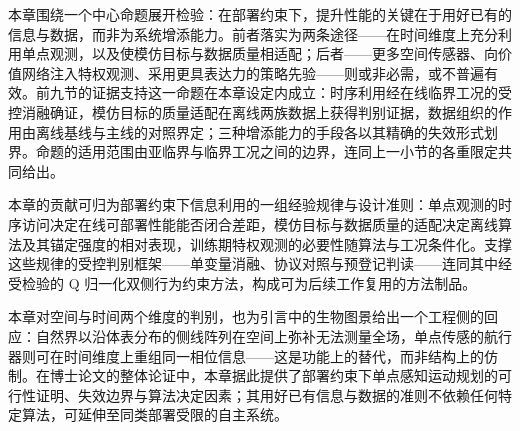 本章围绕一个中心命题展开检验：在部署约束下，提升性能的关键在于用好已有的信息与数据，而非为系统增添能力。前者落实为两条途径——在时间维度上充分利用单点观测，以及使模仿目标与数据质量相适配；后者——更多空间传感器、向价值网络注入特权观测、采用更具表达力的策略先验——则或非必需，或不普遍有效。前九节的证据支持这一命题在本章设定内成立：时序利用经在线临界工况的受控消融确证，模仿目标的质量适配在离线两族数据上获得判别证据，数据组织的作用由离线基线与主线的对照界定；三种增添能力的手段各以其精确的失效形式划界。命题的适用范围由亚临界与临界工况之间的边界，连同上一小节的各重限定共同给出。

本章的贡献可归为部署约束下信息利用的一组经验规律与设计准则：单点观测的时序访问决定在线可部署性能能否闭合差距，模仿目标与数据质量的适配决定离线算法及其锚定强度的相对表现，训练期特权观测的必要性随算法与工况条件化。支撑这些规律的受控判别框架——单变量消融、协议对照与预登记判读——连同其中经受检验的 Q 归一化双侧行为约束方法，构成可为后续工作复用的方法制品。

本章对空间与时间两个维度的判别，也为引言中的生物图景给出一个工程侧的回应：自然界以沿体表分布的侧线阵列在空间上弥补无法测量全场，单点传感的航行器则可在时间维度上重组同一相位信息——这是功能上的替代，而非结构上的仿制。在博士论文的整体论证中，本章据此提供了部署约束下单点感知运动规划的可行性证明、失效边界与算法决定因素；其用好已有信息与数据的准则不依赖任何特定算法，可延伸至同类部署受限的自主系统。
